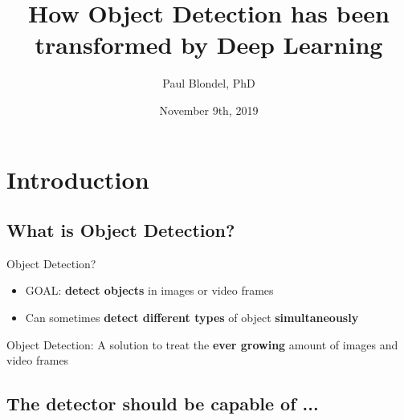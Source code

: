 \documentclass{beamer}[10pt, usepdftitle=false, handout]
\title{How Object Detection has been transformed by Deep Learning}
\author[]{Paul Blondel, PhD}
\institute[]{MIS-Heudyasic, France}
\date[]{November 9th, 2019}
\begin{document}
	{
	\begin{frame}
	\titlepage
	\end{frame}

	\begin{frame}
		\tableofcontents[hideallsubsections]
	\end{frame}
	}

	\addtocounter{framenumber}{-2}

	\section{Introduction}
	\subsection{What is Object Detection?}	
	
    \begin{frame}[label=(first)]
	
	Object Detection?
	\vspace*{1em}
	
	\begin{itemize}
	\item{GOAL: \textbf{detect objects} in images or video frames}
	\item{Can sometimes \textbf{detect different types} of object \textbf{simultaneously}}
	\end{itemize}	
	\vspace*{1em}
	
	\begin{block}{Object Detection:}
	A solution to treat the \textbf{ever growing} amount of images and video frames
	\end{block}	
	
	\end{frame}
    
	\subsection{The detector should be capable of ...}
	
\end{document}
